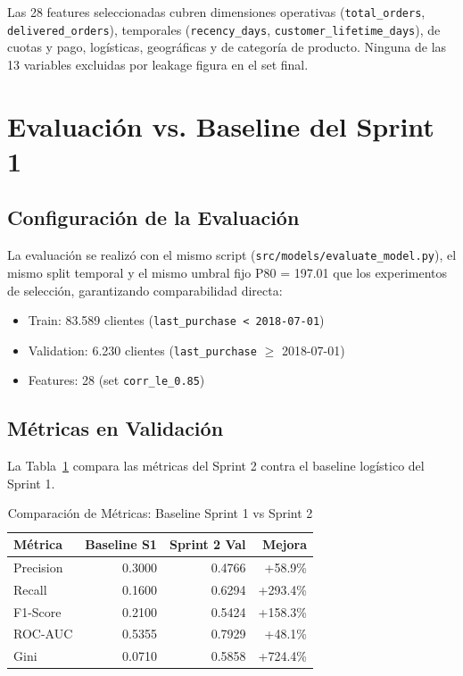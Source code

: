 \documentclass[journal,letterpaper]{IEEEtran}
\begin{document}
Las 28 features seleccionadas cubren dimensiones operativas (\texttt{total\_orders}, \texttt{delivered\_orders}), temporales (\texttt{recency\_days}, \texttt{customer\_lifetime\_days}), de cuotas y pago, logísticas, geográficas y de categoría de producto. Ninguna de las 13 variables excluidas por leakage figura en el set final.

\section{Evaluación vs. Baseline del Sprint 1}
\subsection{Configuración de la Evaluación}
La evaluación se realizó con el mismo script (\texttt{src/models/evaluate\_model.py}), el mismo split temporal y el mismo umbral fijo P80 = 197.01 que los experimentos de selección, garantizando comparabilidad directa:
\begin{itemize}
    \item Train: 83.589 clientes (\texttt{last\_purchase < 2018-07-01})
    \item Validation: 6.230 clientes (\texttt{last\_purchase} $\geq$ 2018-07-01)
    \item Features: 28 (set \texttt{corr\_le\_0.85})
\end{itemize}

\subsection{Métricas en Validación}
La Tabla~\ref{tab:metrics} compara las métricas del Sprint 2 contra el baseline logístico del Sprint 1.

\begin{table}[h]
\centering
\caption{Comparación de Métricas: Baseline Sprint 1 vs Sprint 2}
\label{tab:metrics}
\begin{tabular}{lrrr}
\toprule
Métrica & Baseline S1 & Sprint 2 Val & Mejora \\
\midrule
Precision  & 0.3000 & 0.4766 & +58.9\% \\
Recall     & 0.1600 & 0.6294 & +293.4\% \\
F1-Score   & 0.2100 & 0.5424 & +158.3\% \\
ROC-AUC    & 0.5355 & 0.7929 & +48.1\% \\
Gini       & 0.0710 & 0.5858 & +724.4\% \\
\bottomrule
\end{tabular}
\end{table}
\end{document}
